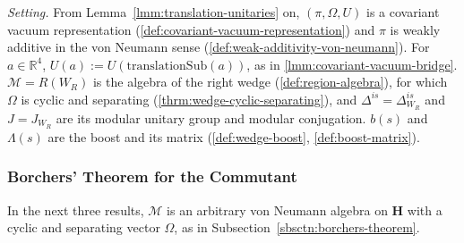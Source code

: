 \emph{Setting.} From Lemma~\ref{lmm:translation-unitaries} on, $(\pi, \Omega, U)$ is a covariant vacuum representation (\ref{def:covariant-vacuum-representation}) and $\pi$ is weakly additive in the von Neumann sense (\ref{def:weak-additivity-von-neumann}). For $a \in \mathbb{R}^4$, $U(a) := U(\mathrm{translationSub}(a))$, as in \ref{lmm:covariant-vacuum-bridge}. $\mathcal{M} = R(W_R)$ is the algebra of the right wedge (\ref{def:region-algebra}), for which $\Omega$ is cyclic and separating (\ref{thrm:wedge-cyclic-separating}), and $\Delta^{is} = \Delta_{W_R}^{is}$ and $J = J_{W_R}$ are its modular unitary group and modular conjugation. $b(s)$ and $\Lambda(s)$ are the boost and its matrix (\ref{def:wedge-boost}, \ref{def:boost-matrix}).

\subsubsection{Borchers' Theorem for the Commutant}

In the next three results, $\mathcal{M}$ is an arbitrary von Neumann algebra on $\mathbf{H}$ with a cyclic and separating vector $\Omega$, as in Subsection~\ref{sbsctn:borchers-theorem}.

